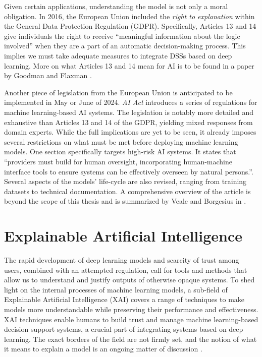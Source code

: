 Given certain applications, understanding the model is not only a moral obligation.
In 2016, the European Union included the \emph{right to explanation} within the General Data Protection Regulation (GDPR).
Specifically, Articles 13 and 14 give individuals the right to receive ``meaningful information about the logic involved'' when they are a part of an automatic decision-making process.
This implies we must take adequate measures to integrate DSSs based on deep learning.
More on what Articles 13 and 14 mean for AI is to be found in a paper by Goodman and Flaxman \cite{xai-gdpr}.

Another piece of legislation from the European Union is anticipated to be implemented in May or June of 2024.
\emph{AI Act} introduces a series of regulations for machine learning-based AI systems.
The legislation is notably more detailed and exhaustive than Articles 13 and 14 of the GDPR, yielding mixed responses from domain experts.
While the full implications are yet to be seen, it already imposes several restrictions on what must be met before deploying machine learning models.
One section specifically targets high-risk AI systems.
It states that ``providers must build for human oversight, incorporating human-machine interface tools to ensure systems can be effectively overseen by natural persons.''.
Several aspects of the models' life-cycle are also revised, ranging from training datasets to technical documentation.
A comprehensive overview of the article is beyond the scope of this thesis and is summarized by Veale and Borgesius in \cite{xai-ai-act}.

\section{Explainable Artificial Intelligence}

The rapid development of deep learning models and scarcity of trust among users, combined with an attempted regulation, call for tools and methods that allow us to understand and justify outputs of otherwise opaque systems.
To shed light on the internal processes of machine learning models, a sub-field of Explainable Artificial Intelligence (XAI) covers a range of techniques to make models more understandable while preserving their performance and effectiveness.
XAI techniques enable humans to build trust and manage machine learning-based decision support systems, a crucial part of integrating systems based on deep learning.
The exact borders of the field are not firmly set, and the notion of what it means to explain a model is an ongoing matter of discussion \cite{xai-survey}.

